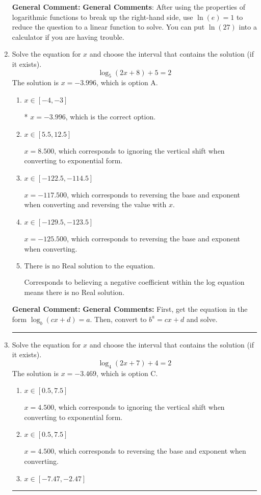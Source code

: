 \documentclass{extbook}[14pt]
\newcommand{\litem}[1]{\item #1

\rule{\textwidth}{0.4pt}}
\begin{document}
\begin{enumerate}
{\textbf{General Comment:} \textbf{General Comments}: After using the properties of logarithmic functions to break up the right-hand side, use $\ln(e) = 1$ to reduce the question to a linear function to solve. You can put $\ln(27)$ into a calculator if you are having trouble.
}
\litem{
Solve the equation for $x$ and choose the interval that contains the solution (if it exists).
\[ \log_{5}{(2x+8)}+5 = 2 \]The solution is \( x = -3.996 \), which is option A.\begin{enumerate}[label=\Alph*.]
\item \( x \in [-4, -3] \)

* $x = -3.996$, which is the correct option.
\item \( x \in [5.5, 12.5] \)

$x = 8.500$, which corresponds to ignoring the vertical shift when converting to exponential form.
\item \( x \in [-122.5, -114.5] \)

$x = -117.500$, which corresponds to reversing the base and exponent when converting and reversing the value with $x$.
\item \( x \in [-129.5, -123.5] \)

$x = -125.500$, which corresponds to reversing the base and exponent when converting.
\item \( \text{There is no Real solution to the equation.} \)

Corresponds to believing a negative coefficient within the log equation means there is no Real solution.
\end{enumerate}

\textbf{General Comment:} \textbf{General Comments:} First, get the equation in the form $\log_b{(cx+d)} = a$. Then, convert to $b^a = cx+d$ and solve.
}
\litem{
Solve the equation for $x$ and choose the interval that contains the solution (if it exists).
\[ \log_{4}{(2x+7)}+4 = 2 \]The solution is \( x = -3.469 \), which is option C.\begin{enumerate}[label=\Alph*.]
\item \( x \in [0.5, 7.5] \)

$x = 4.500$, which corresponds to ignoring the vertical shift when converting to exponential form.
\item \( x \in [0.5, 7.5] \)

$x = 4.500$, which corresponds to reversing the base and exponent when converting.
\item \( x \in [-7.47, -2.47] \)


\end{enumerate}}
\end{enumerate}
\end{document}
